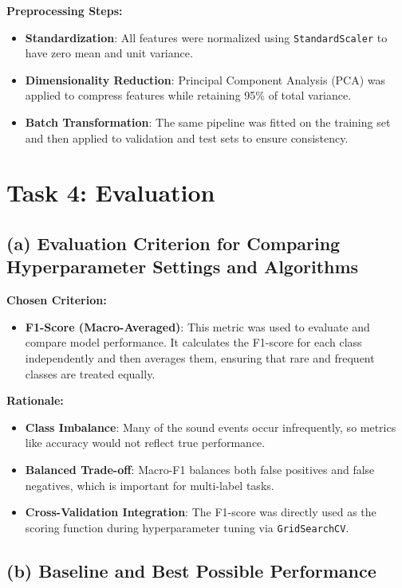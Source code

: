 \documentclass{article}
\begin{document}
\textbf{Preprocessing Steps:}
\begin{itemize}
    \item \textbf{Standardization}: All features were normalized using \texttt{StandardScaler} to have zero mean and unit variance.
    \item \textbf{Dimensionality Reduction}: Principal Component Analysis (PCA) was applied to compress features while retaining 95\% of total variance.
    \item \textbf{Batch Transformation}: The same pipeline was fitted on the training set and then applied to validation and test sets to ensure consistency.
\end{itemize}


\vspace{1em}

\section*{Task 4: Evaluation}

\subsection*{(a) Evaluation Criterion for Comparing Hyperparameter Settings and Algorithms}

\textbf{Chosen Criterion:}
\begin{itemize}
    \item \textbf{F1-Score (Macro-Averaged)}: This metric was used to evaluate and compare model performance. It calculates the F1-score for each class independently and then averages them, ensuring that rare and frequent classes are treated equally.
\end{itemize}

\textbf{Rationale:}
\begin{itemize}
    \item \textbf{Class Imbalance}: Many of the sound events occur infrequently, so metrics like accuracy would not reflect true performance.
    \item \textbf{Balanced Trade-off}: Macro-F1 balances both false positives and false negatives, which is important for multi-label tasks.
    \item \textbf{Cross-Validation Integration}: The F1-score was directly used as the scoring function during hyperparameter tuning via \texttt{GridSearchCV}.
\end{itemize}

\subsection*{(b) Baseline and Best Possible Performance}
\end{document}
